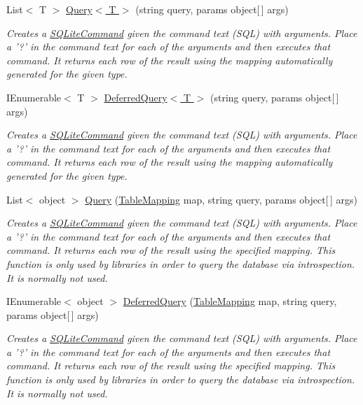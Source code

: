 \begin{DoxyCompactItemize}
\item 
List$<$ T $>$ \hyperlink{classSQLite_1_1SQLiteConnection_ade363948abe65a6b97fe8574f943db91}{Query$<$ T $>$} (string query, params object\mbox{[}$\,$\mbox{]} args)
\begin{DoxyCompactList}\small\item\em Creates a \hyperlink{classSQLite_1_1SQLiteCommand}{S\-Q\-Lite\-Command} given the command text (S\-Q\-L) with arguments. Place a '?' in the command text for each of the arguments and then executes that command. It returns each row of the result using the mapping automatically generated for the given type. \end{DoxyCompactList}\item 
I\-Enumerable$<$ T $>$ \hyperlink{classSQLite_1_1SQLiteConnection_a334b139ead4620ad13b5e1d54e8077af}{Deferred\-Query$<$ T $>$} (string query, params object\mbox{[}$\,$\mbox{]} args)
\begin{DoxyCompactList}\small\item\em Creates a \hyperlink{classSQLite_1_1SQLiteCommand}{S\-Q\-Lite\-Command} given the command text (S\-Q\-L) with arguments. Place a '?' in the command text for each of the arguments and then executes that command. It returns each row of the result using the mapping automatically generated for the given type. \end{DoxyCompactList}\item 
List$<$ object $>$ \hyperlink{classSQLite_1_1SQLiteConnection_aeac8a5ef1be5cfabc5bbf33f1fec01b0}{Query} (\hyperlink{classSQLite_1_1TableMapping}{Table\-Mapping} map, string query, params object\mbox{[}$\,$\mbox{]} args)
\begin{DoxyCompactList}\small\item\em Creates a \hyperlink{classSQLite_1_1SQLiteCommand}{S\-Q\-Lite\-Command} given the command text (S\-Q\-L) with arguments. Place a '?' in the command text for each of the arguments and then executes that command. It returns each row of the result using the specified mapping. This function is only used by libraries in order to query the database via introspection. It is normally not used. \end{DoxyCompactList}\item 
I\-Enumerable$<$ object $>$ \hyperlink{classSQLite_1_1SQLiteConnection_ab359d97e7938a573e0a565d2c46aa401}{Deferred\-Query} (\hyperlink{classSQLite_1_1TableMapping}{Table\-Mapping} map, string query, params object\mbox{[}$\,$\mbox{]} args)
\begin{DoxyCompactList}\small\item\em Creates a \hyperlink{classSQLite_1_1SQLiteCommand}{S\-Q\-Lite\-Command} given the command text (S\-Q\-L) with arguments. Place a '?' in the command text for each of the arguments and then executes that command. It returns each row of the result using the specified mapping. This function is only used by libraries in order to query the database via introspection. It is normally not used. \end{DoxyCompactList}\item 

\end{DoxyCompactItemize}
